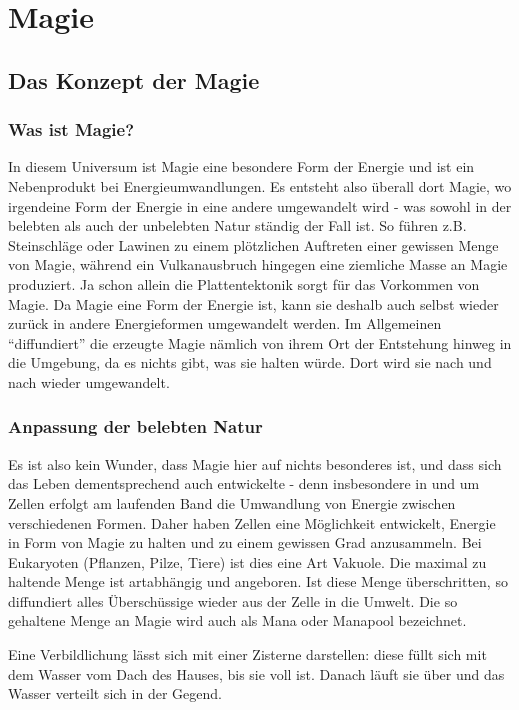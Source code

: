\chapter{Magie}
\section{Das Konzept der Magie}
\subsection{Was ist Magie?}
In diesem Universum ist Magie eine besondere Form der Energie und ist ein Nebenprodukt bei Energieumwandlungen.
Es entsteht also überall dort Magie, wo irgendeine Form der Energie in eine andere umgewandelt wird - was sowohl in der belebten als auch der unbelebten Natur ständig der Fall ist.
So führen z.B. Steinschläge oder Lawinen zu einem plötzlichen Auftreten einer gewissen Menge von Magie, während ein Vulkanausbruch hingegen eine ziemliche Masse an Magie produziert. 
Ja schon allein die Plattentektonik sorgt für das Vorkommen von Magie.
Da Magie eine Form der Energie ist, kann sie deshalb auch selbst wieder zurück in andere Energieformen umgewandelt werden.
Im Allgemeinen "`diffundiert"' die erzeugte Magie nämlich von ihrem Ort der Entstehung hinweg in die Umgebung, da es nichts gibt, was sie halten würde.
Dort wird sie nach und nach wieder umgewandelt.


\subsection{Anpassung der belebten Natur}
Es ist also kein Wunder, dass Magie hier auf  nichts besonderes ist, und dass sich das Leben dementsprechend auch entwickelte - denn insbesondere in und um Zellen erfolgt am laufenden Band die Umwandlung von Energie zwischen verschiedenen Formen.
Daher haben Zellen eine Möglichkeit entwickelt, Energie in Form von Magie zu halten und zu einem gewissen Grad anzusammeln.
Bei Eukaryoten (Pflanzen, Pilze, Tiere) ist dies eine Art Vakuole. 
Die maximal zu haltende Menge ist artabhängig und angeboren.
Ist diese Menge überschritten, so diffundiert alles Überschüssige wieder aus der Zelle in die Umwelt.
Die so gehaltene Menge an Magie wird auch als Mana oder Manapool bezeichnet.

Eine Verbildlichung lässt sich mit einer Zisterne darstellen: diese füllt sich mit dem Wasser vom Dach des Hauses, bis sie voll ist.
Danach läuft sie über und das Wasser verteilt sich in der Gegend.

